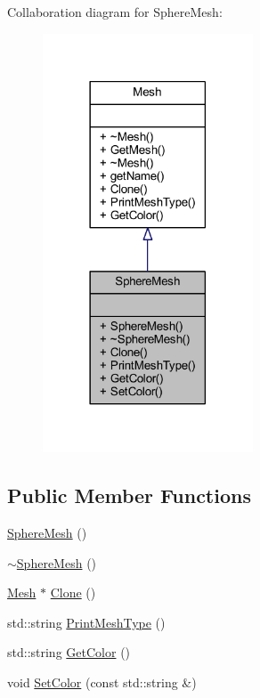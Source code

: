 Collaboration diagram for Sphere\+Mesh\+:
\nopagebreak
\begin{figure}[H]
\begin{center}
\leavevmode
\includegraphics[width=177pt]{class_sphere_mesh__coll__graph}
\end{center}
\end{figure}
\subsection*{Public Member Functions}
\begin{DoxyCompactItemize}
\item 
\mbox{\hyperlink{class_sphere_mesh_a96328df52e8e6e34ad043c4131579947}{Sphere\+Mesh}} ()
\item 
\mbox{\hyperlink{class_sphere_mesh_a7cfb19d071eed16544d3c01c63280399}{$\sim$\+Sphere\+Mesh}} ()
\item 
\mbox{\hyperlink{class_mesh}{Mesh}} $\ast$ \mbox{\hyperlink{class_sphere_mesh_a5dfa031b4cdd31a81154221c882a5dfa}{Clone}} ()
\item 
std\+::string \mbox{\hyperlink{class_sphere_mesh_ad40fa08f33e72acf0410c2ce6099ca4c}{Print\+Mesh\+Type}} ()
\item 
std\+::string \mbox{\hyperlink{class_sphere_mesh_a1c490b89552f51b7960dc760ac09edf8}{Get\+Color}} ()
\item 
void \mbox{\hyperlink{class_sphere_mesh_a8e9e0a923060501e12f278508ac96f13}{Set\+Color}} (const std\+::string \&)
\end{DoxyCompactItemize}


